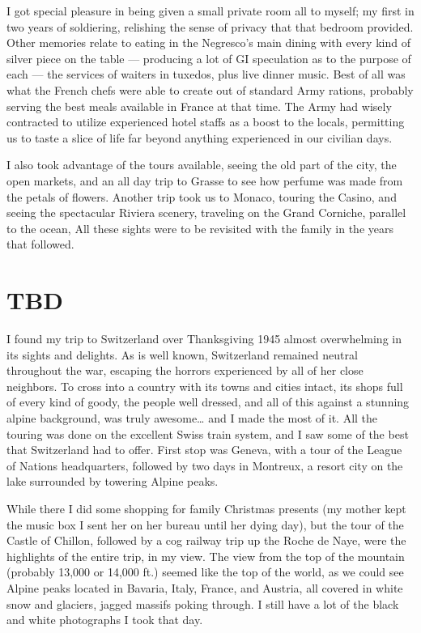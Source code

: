 \documentclass[../m3y]{subfiles}
\begin{document}
I got special pleasure in being given a small private room all to myself; my first in two years of soldiering, relishing the sense of privacy that that bedroom provided. Other memories relate to eating in the Negresco's main dining with every kind of silver piece on the table --- producing a lot of GI speculation as to the purpose of each --- the services of waiters in tuxedos, plus live dinner music. Best of all was what the French chefs were able to create out of standard Army rations, probably serving the best meals available in France at that time. The Army had wisely contracted to utilize experienced hotel staffs as a boost to the locals, permitting us to taste a slice of life far beyond anything experienced in our civilian days.

I also took advantage of the tours available, seeing the old part of the city, the open markets, and an all day trip to Grasse to see how perfume was made from the petals of flowers. Another trip took us to Monaco, touring the Casino, and seeing the spectacular Riviera scenery, traveling on the Grand Corniche, parallel to the ocean, All these sights were to be revisited with the family in the years that followed.

\section{TBD}
I found my trip to Switzerland over Thanksgiving 1945 almost overwhelming in its sights and delights. As is well known, Switzerland remained neutral throughout the war, escaping the horrors experienced by all of her close neighbors. To cross into a country with its towns and cities intact, its shops full of every kind of goody, the people well dressed, and all of this against a stunning alpine background, was truly awesome… and I made the most of it. All the touring was done on the excellent Swiss train system, and I saw some of the best that Switzerland had to offer. First stop was Geneva, with a tour of the League of Nations headquarters, followed by two days in Montreux, a resort city on the lake surrounded by towering Alpine peaks.

While there I did some shopping for family Christmas presents (my mother kept the music box I sent her on her bureau until her dying day), but the tour of the Castle of Chillon, followed by a cog railway trip up the Roche de Naye, were the highlights of the entire trip, in my view. The view from the top of the mountain (probably 13,000 or 14,000 ft.) seemed like the top of the world, as we could see Alpine peaks located in Bavaria, Italy, France, and Austria, all covered in white snow and glaciers, jagged massifs poking through. I still have a lot of the black and white photographs I took that day.
\end{document}
